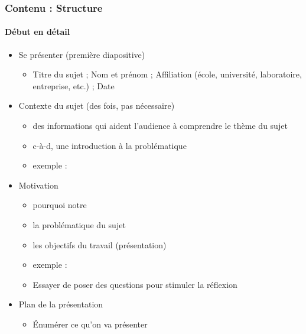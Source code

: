 \documentclass[xcolor=table, usenames,dvipsnames]{beamer}
\begin{document}
\begin{frame}
\frametitle{Contenu : Structure}
\framesubtitle{Début en détail}

\begin{itemize}
	\item Se présenter (première diapositive)
	\begin{itemize}
		\item Titre du sujet ; Nom et prénom ; Affiliation (école, université, laboratoire, entreprise, etc.) ; Date
	\end{itemize}

	\item Contexte du sujet (des fois, pas nécessaire)
	\begin{itemize}
		\item des informations qui aident l'audience à comprendre le thème du sujet
		\item c-à-d, une introduction à la problématique 
		\item exemple : 
	\end{itemize}

	\item Motivation
	\begin{itemize}
		\item pourquoi notre
		\item la problématique du sujet
		\item les objectifs du travail (présentation)
		\item exemple : 
		\item Essayer de poser des questions pour stimuler la réflexion
	\end{itemize}

	\item Plan de la présentation
	\begin{itemize}
		\item Énumérer ce qu'on va présenter 
	\end{itemize}
\end{itemize}

\end{frame}
\end{document}

